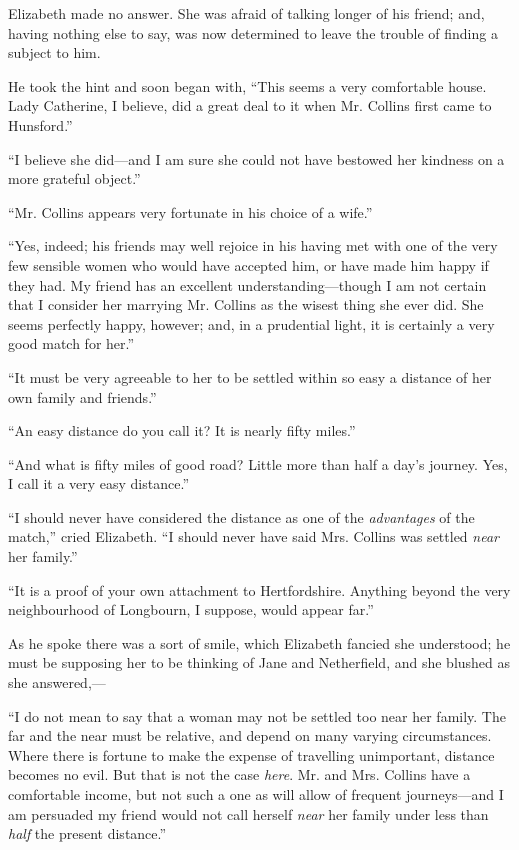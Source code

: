 \documentclass[12pt]{book}
\begin{document}
Elizabeth made no answer. She was afraid of talking longer of his friend; and, having nothing else to say, was now determined to leave the trouble of finding a subject to him.

He took the hint and soon began with, ``This seems a very comfortable house. Lady Catherine, I believe, did a great deal to it when Mr. Collins first came to Hunsford.''

``I believe she did---and I am sure she could not have bestowed her kindness on a more grateful object.''

``Mr. Collins appears very fortunate in his choice of a wife.''

``Yes, indeed; his friends may well rejoice in his having met with one of the very few sensible women who would have accepted him, or have made him happy if they had. My friend has an excellent understanding---though I am not certain that I consider her marrying Mr. Collins as the wisest thing she ever did. She seems perfectly happy, however; and, in a prudential light, it is certainly a very good match for her.''

``It must be very agreeable to her to be settled within so easy a distance of her own family and friends.''

``An easy distance do you call it? It is nearly fifty miles.''

``And what is fifty miles of good road? Little more than half a day's journey. Yes, I call it a very easy distance.''

``I should never have considered the distance as one of the \textit{advantages} of the match,'' cried Elizabeth. ``I should never have said Mrs. Collins was settled \textit{near} her family.''

``It is a proof of your own attachment to Hertfordshire. Anything beyond the very neighbourhood of Longbourn, I suppose, would appear far.''

As he spoke there was a sort of smile, which Elizabeth fancied she understood; he must be supposing her to be thinking of Jane and Netherfield, and she blushed as she answered,---

``I do not mean to say that a woman may not be settled too near her family. The far and the near must be relative, and depend on many varying circumstances. Where there is fortune to make the expense of travelling unimportant, distance becomes no evil. But that is not the case \textit{here}. Mr. and Mrs. Collins have a comfortable income, but not such a one as will allow of frequent journeys---and I am persuaded my friend would not call herself \textit{near} her family under less than \textit{half} the present distance.''
\end{document}
